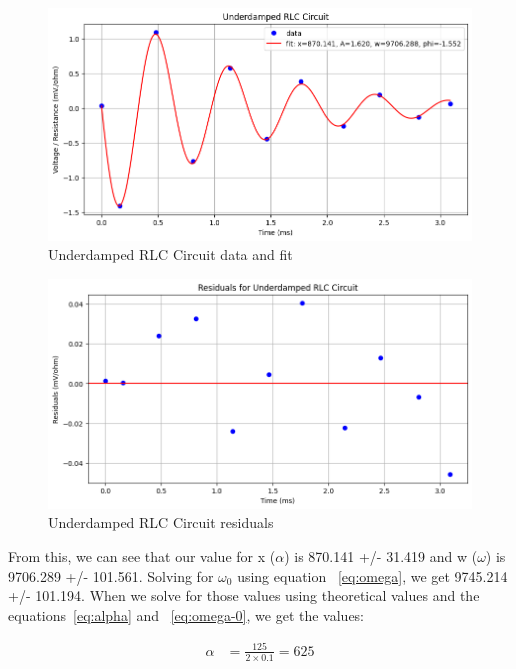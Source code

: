 \documentclass[11pt]{article}
\begin{document}
    \begin{figure}[H]
        \centering
        \includegraphics[width=1.0\linewidth]{resources/images/rlc 2a fit}
        \caption{Underdamped RLC Circuit data and fit}
    \end{figure}

    \begin{figure}[H]
        \centering
        \includegraphics[width=1.0\linewidth]{resources/images/rlc 2a fit residuals}
        \caption{Underdamped RLC Circuit residuals}
    \end{figure}

    From this, we can see that our value for x (\( \alpha \)) is 870.141 +/- 31.419 and w (\( \omega \)) is 9706.289 +/- 101.561. Solving for \( \omega_0 \) using equation ~\ref{eq:omega}, we get 9745.214 +/- 101.194. When we solve for those values using theoretical values and the equations~\ref{eq:alpha} and ~\ref{eq:omega-0}, we get the values:

    \begin{align*}
        \alpha &= \frac{125}{2 \times 0.1} = 625
    \end{align*}
\end{document}
